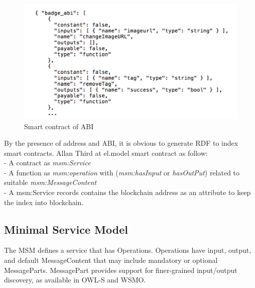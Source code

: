 \begin{center}
	\begin{figure}[htb!]
		
		\begin{minipage}{0.55\linewidth}
			\centering
			\includegraphics[width=1.95\textwidth]{images/chap02_SmartContract_ABI.png}
		\end{minipage}
		\caption[Smart contract of ABI]{Smart  contract of ABI}
		
	\end{figure}
	
\end{center}
By the presence of address and ABI, it is obvious to generate RDF to index smart contracts.
Allan Third at el.\cite{Third}model smart contract as follow:\\
- A contract as \textit{msm:Service}\\
- A function as \textit{msm:operation} with (\textit{msm:hasInput} or \textit{hasOutPut}) related to suitable \textit{msm:MessageContent}\\
- A msm:Service records contains the blockchain address as an attribute to keep the index into blockchain.

\subsection{Minimal Service Model}
The MSM defines a service that has Operations. Operations have input, output, and default MessageContent that may include mandatory or optional MessageParts. MessagePart provides support for finer-grained input/output discovery, as available in OWL-S and WSMO\cite{Rashid}.

